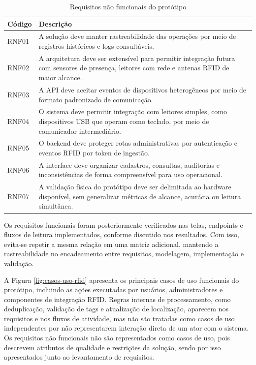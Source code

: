 \begin{table}[H]
\centering
\footnotesize
\setlength{\tabcolsep}{4pt}
\renewcommand{\arraystretch}{1.12}
\caption{Requisitos não funcionais do protótipo}
\label{tab:requisitos-nao-funcionais}
\begin{tabularx}{\textwidth}{>{\raggedright\arraybackslash}p{1.5cm}>{\raggedright\arraybackslash}X}
\toprule
\textbf{Código} & \textbf{Descrição} \\
\midrule
RNF01 & A solução deve manter rastreabilidade das operações por meio de registros históricos e logs consultáveis. \\
RNF02 & A arquitetura deve ser extensível para permitir integração futura com sensores de presença, leitores com rede e antenas RFID de maior alcance. \\
RNF03 & A API deve aceitar eventos de dispositivos heterogêneos por meio de formato padronizado de comunicação. \\
RNF04 & O sistema deve permitir integração com leitores simples, como dispositivos USB que operam como teclado, por meio de comunicador intermediário. \\
RNF05 & O backend deve proteger rotas administrativas por autenticação e eventos RFID por token de ingestão. \\
RNF06 & A interface deve organizar cadastros, consultas, auditorias e inconsistências de forma compreensível para uso operacional. \\
RNF07 & A validação física do protótipo deve ser delimitada ao hardware disponível, sem generalizar métricas de alcance, acurácia ou leitura simultânea. \\
\bottomrule
\end{tabularx}
\end{table}

Os requisitos funcionais foram posteriormente verificados nas telas, endpoints e fluxos de leitura implementados, conforme discutido nos resultados. Com isso, evita-se repetir a mesma relação em uma matriz adicional, mantendo a rastreabilidade no encadeamento entre requisitos, modelagem, implementação e validação.

A Figura \ref{fig:casos-uso-rfid} apresenta os principais casos de uso funcionais do protótipo, incluindo as ações executadas por usuários, administradores e componentes de integração RFID. Regras internas de processamento, como deduplicação, validação de tags e atualização de localização, aparecem nos requisitos e nos fluxos de atividade, mas não são tratadas como casos de uso independentes por não representarem interação direta de um ator com o sistema. Os requisitos não funcionais não são representados como casos de uso, pois descrevem atributos de qualidade e restrições da solução, sendo por isso apresentados junto ao levantamento de requisitos.

